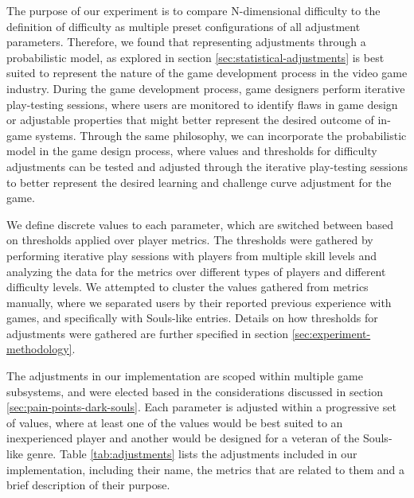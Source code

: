 The purpose of our experiment is to compare N-dimensional difficulty to the definition of difficulty as multiple preset configurations of all adjustment parameters. Therefore, we found that representing adjustments through a probabilistic model, as explored in section \ref{sec:statistical-adjustments} is best suited to represent the nature of the game development process in the video game industry. During the game development process, game designers perform iterative play-testing sessions, where users are monitored to identify flaws in game design or adjustable properties that might better represent the desired outcome of in-game systems. Through the same philosophy, we can incorporate the probabilistic model in the game design process, where values and thresholds for difficulty adjustments can be tested and adjusted through the iterative play-testing sessions to better represent the desired learning and challenge curve adjustment for the game.

We define discrete values to each parameter, which are switched between based on thresholds applied over player metrics. The thresholds were gathered by performing iterative play sessions with players from multiple skill levels and analyzing the data for the metrics over different types of players and different difficulty levels. We attempted to cluster the values gathered from metrics manually, where we separated users by their reported previous experience with games, and specifically with Souls-like entries. Details on how thresholds for adjustments were gathered are further specified in section \ref{sec:experiment-methodology}.

The adjustments in our implementation are scoped within multiple game subsystems, and were elected based in the considerations discussed in section \ref{sec:pain-points-dark-souls}. Each parameter is adjusted within a progressive set of values, where at least one of the values would be best suited to an inexperienced player and another would be designed for a veteran of the Souls-like genre. Table \ref{tab:adjustments} lists the adjustments included in our implementation, including their name, the metrics that are related to them and a brief description of their purpose.


